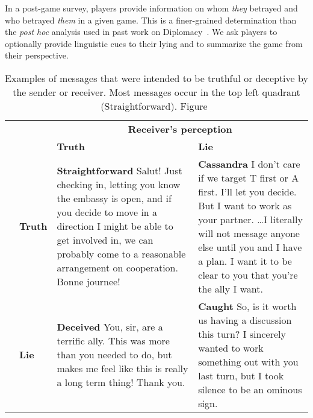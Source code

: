 
In a post-game survey, players provide information on whom
\textit{they} betrayed and who betrayed \textit{them} in a given game.
%
This is a finer-grained determination than the \textit{post hoc} analysis used in past work on
Diplomacy~\citep{niculaelinguistic}.
%
We ask players to optionally provide linguistic cues to their lying
and to summarize the game from their perspective.

\begin{table*}[t]
	\small
	
	
	\begin{tabularx}{\textwidth}{r  l   X X}
		
		& &\multicolumn{2}{c}{\textbf{Receiver's perception}} \\
		
		& &  \textbf{Truth }&  \textbf{Lie} \\
		\toprule
		\multirow{2}{*}{ \rotatebox[origin=r]{90}{\textbf{Sender's intention}}} & \textbf{Truth}
		& \cellcolor{gray!25}\textbf{Straightforward}
		Salut! Just checking in, letting you know the embassy is open, and if you decide to move in a direction I might be able to get involved in, we can probably come to a reasonable arrangement on cooperation.  Bonne journee!
		& \textbf{Cassandra}
		I don't care if we target T first or A first. I'll let you decide. But I want to work as your partner. \dots I literally will not message anyone else until you and I have a plan. I want it to be clear to you that you're the ally I want.
		\\
		& \textbf{Lie}
		& \textbf{Deceived}
		You, sir, are a terrific ally. This was more than you needed to do, but makes me feel like this is really a long term thing! Thank you.
		&  \cellcolor{gray!25}\textbf{Caught}
		So, is it worth us having a discussion this turn? I sincerely wanted to work something out with you last turn, but I took silence to be an ominous sign.
		\\
		\bottomrule
	\end{tabularx}
	\caption{Examples of messages that were intended to be
          truthful or deceptive by the sender or receiver.  Most
          messages occur in the top left quadrant
          (Straightforward).  Figure~}
	\label{tab:quadrant}
\end{table*}




